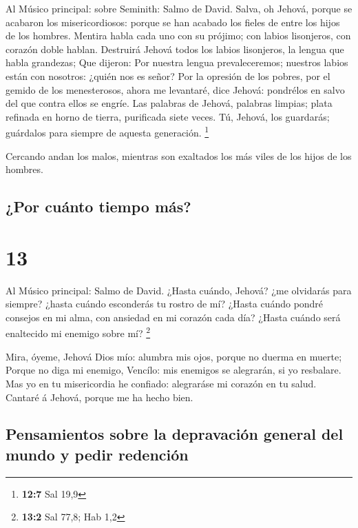  Al Músico principal: sobre Seminith: Salmo de David. Salva,
oh Jehová, porque se acabaron los misericordiosos: porque se han acabado
los fieles de entre los hijos de los hombres.  Mentira habla
cada uno con su prójimo; con labios lisonjeros, con corazón doble
hablan.  Destruirá Jehová todos los labios lisonjeros, la
lengua que habla grandezas;  Que dijeron: Por nuestra lengua
prevaleceremos; nuestros labios están con nosotros: ¿quién nos es señor?
 Por la opresión de los pobres, por el gemido de los
menesterosos, ahora me levantaré, dice Jehová: pondrélos en salvo del
que contra ellos se engríe.  Las palabras de Jehová,
palabras limpias; plata refinada en horno de tierra, purificada siete
veces.  Tú, Jehová, los guardarás; guárdalos para siempre de
aquesta generación. \footnote{\textbf{12:7} Sal 19,9}

 Cercando andan los malos, mientras son exaltados los más
viles de los hijos de los hombres.

\hypertarget{por-cuuxe1nto-tiempo-muxe1s}{%
\subsection{¿Por cuánto tiempo más?}\label{por-cuuxe1nto-tiempo-muxe1s}}

\hypertarget{section-12}{%
\section{13}\label{section-12}}

 Al Músico principal: Salmo de David. ¿Hasta cuándo, Jehová?
¿me olvidarás para siempre? ¿hasta cuándo esconderás tu rostro de mí?
 ¿Hasta cuándo pondré consejos en mi alma, con ansiedad en
mi corazón cada día? ¿Hasta cuándo será enaltecido mi enemigo sobre mí?
\footnote{\textbf{13:2} Sal 77,8; Hab 1,2}

 Mira, óyeme, Jehová Dios mío: alumbra mis ojos, porque no
duerma en muerte;  Porque no diga mi enemigo, Vencílo: mis
enemigos se alegrarán, si yo resbalare.  Mas yo en tu
misericordia he confiado: alegraráse mi corazón en tu salud.
 Cantaré á Jehová, porque me ha hecho bien.

\hypertarget{pensamientos-sobre-la-depravaciuxf3n-general-del-mundo-y-pedir-redenciuxf3n}{%
\subsection{Pensamientos sobre la depravación general del mundo y pedir
redención}\label{pensamientos-sobre-la-depravaciuxf3n-general-del-mundo-y-pedir-redenciuxf3n}}

